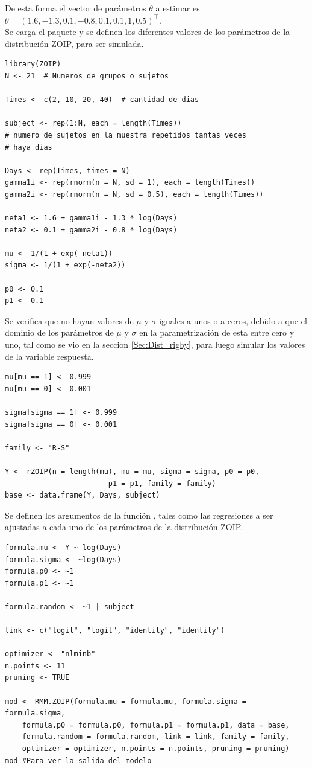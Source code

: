 De esta forma el vector de par\'{a}metros $\theta$ a estimar es $\theta=(1.6, -1.3, 0.1, -0.8, 0.1, 0.1, 1, 0.5)^{\top}$.\\

Se carga el paquete  y se definen los diferentes valores de los par\'{a}metros de la distribuci\'{o}n ZOIP, para ser simulada.


\begin{verbatim}
library(ZOIP)
N <- 21  # Numeros de grupos o sujetos

Times <- c(2, 10, 20, 40)  # cantidad de dias

subject <- rep(1:N, each = length(Times))
# numero de sujetos en la muestra repetidos tantas veces
# haya dias

Days <- rep(Times, times = N)
gamma1i <- rep(rnorm(n = N, sd = 1), each = length(Times))
gamma2i <- rep(rnorm(n = N, sd = 0.5), each = length(Times))

neta1 <- 1.6 + gamma1i - 1.3 * log(Days)
neta2 <- 0.1 + gamma2i - 0.8 * log(Days)

mu <- 1/(1 + exp(-neta1))
sigma <- 1/(1 + exp(-neta2))

p0 <- 0.1
p1 <- 0.1
\end{verbatim}

Se verifica que no hayan valores de $\mu$ y $\sigma$ iguales a unos o a ceros, debido a que el dominio de los par\'{a}metros de $\mu$ y $\sigma$ en la parametrizaci\'{o}n de \cite{Stasinopoulos2} esta entre cero y uno, tal como se vio en la seccion \ref{Sec:Dist_rigby}, para luego simular los valores de la variable respuesta.

\begin{verbatim}
mu[mu == 1] <- 0.999
mu[mu == 0] <- 0.001

sigma[sigma == 1] <- 0.999
sigma[sigma == 0] <- 0.001

family <- "R-S"

Y <- rZOIP(n = length(mu), mu = mu, sigma = sigma, p0 = p0, 
						p1 = p1, family = family)
base <- data.frame(Y, Days, subject)
\end{verbatim}

Se definen los argumentos de la funci\'{o}n , tales como las regresiones a ser ajustadas a cada uno de los par\'{a}metros de la distribuci\'{o}n ZOIP.

\begin{verbatim}
formula.mu <- Y ~ log(Days)
formula.sigma <- ~log(Days)
formula.p0 <- ~1
formula.p1 <- ~1

formula.random <- ~1 | subject

link <- c("logit", "logit", "identity", "identity")

optimizer <- "nlminb"
n.points <- 11
pruning <- TRUE

mod <- RMM.ZOIP(formula.mu = formula.mu, formula.sigma = formula.sigma, 
    formula.p0 = formula.p0, formula.p1 = formula.p1, data = base, 
    formula.random = formula.random, link = link, family = family, 
    optimizer = optimizer, n.points = n.points, pruning = pruning)
mod #Para ver la salida del modelo
\end{verbatim}

